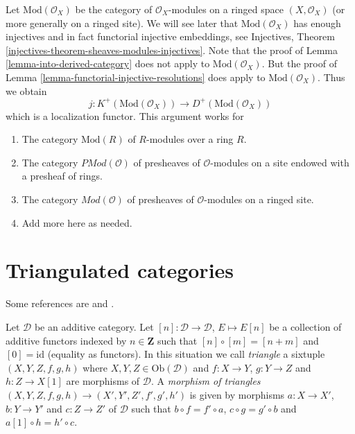 \begin{remark}
\label{remark-big-abelian-category}
Let $\text{Mod}(\mathcal{O}_X)$ be the category of $\mathcal{O}_X$-modules
on a ringed space $(X, \mathcal{O}_X)$ (or more generally on a
ringed site). We will see later that $\text{Mod}(\mathcal{O}_X)$ has enough
injectives and in fact functorial injective embeddings, see
Injectives, Theorem \ref{injectives-theorem-sheaves-modules-injectives}.
Note that the proof of Lemma \ref{lemma-into-derived-category} does
not apply to $\text{Mod}(\mathcal{O}_X)$. But the proof of
Lemma \ref{lemma-functorial-injective-resolutions} does apply
to $\text{Mod}(\mathcal{O}_X)$. Thus we obtain
$$
j : K^{+}(\text{Mod}(\mathcal{O}_X))
\longrightarrow
D^{+}(\text{Mod}(\mathcal{O}_X))
$$
which is a localization functor. This argument works for
\begin{enumerate}
\item The category $\text{Mod}(R)$ of $R$-modules over a ring $R$.
\item The category $\textit{PMod}(\mathcal{O})$ of presheaves of
$\mathcal{O}$-modules on a site endowed with a presheaf of rings.
\item The category $\textit{Mod}(\mathcal{O})$ of presheaves of
$\mathcal{O}$-modules on a ringed site.
\item Add more here as needed.
\end{enumerate}
\end{remark}













\section{Triangulated categories}
\label{section-triangulated-categories}

\noindent
Some references are \cite{Verdier} and \cite{Neeman}.

\begin{definition}
\label{definition-triangle}
Let $\mathcal{D}$ be an additive category.
Let $[n] : \mathcal{D} \to \mathcal{D}$, $E \mapsto E[n]$
be a collection of additive functors indexed by $n \in \mathbf{Z}$ such that
$[n] \circ [m] = [n + m]$  and $[0] = \text{id}$ (equality as functors).
In this situation
we call {\it triangle} a sixtuple $(X, Y, Z, f, g, h)$
where $X, Y, Z \in \text{Ob}(\mathcal{D})$ and
$f : X \to Y$, $g : Y \to Z$ and $h : Z \to X[1]$ are morphisms
of $\mathcal{D}$.
A {\it morphism of triangles}
$(X, Y, Z, f, g, h) \to (X', Y', Z', f', g', h')$
is given by morphisms $a : X \to X'$, $b : Y \to Y'$ and $c : Z \to Z'$
of $\mathcal{D}$ such that
$b \circ f = f' \circ a$, $c  \circ g = g' \circ b$ and
$a[1] \circ h = h' \circ c$.
\end{definition}

